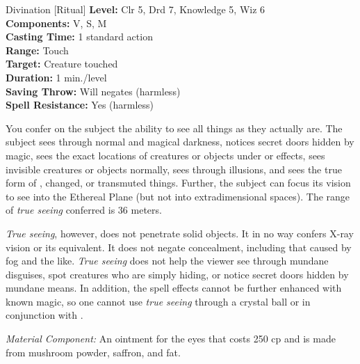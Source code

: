 {Divination [Ritual]}
{
	\textbf{Level:}
	Clr 5, Drd 7, Knowledge 5, Wiz 6\\
	\textbf{Components:}
	V, S, M\\
	\textbf{Casting Time:}
	1 standard action\\
	\textbf{Range:}
	Touch\\
	\textbf{Target:}
	Creature touched\\
	\textbf{Duration:}
	1 min./level\\
	\textbf{Saving Throw:}
	Will negates (harmless)\\
	\textbf{Spell Resistance:}
	Yes (harmless)\\
}
{
	You confer on the subject the ability to see all things as they actually are. The subject sees through normal and magical darkness, notices secret doors hidden by magic, sees the exact locations of creatures or objects under  or  effects, sees invisible creatures or objects normally, sees through illusions, and sees the true form of , changed, or transmuted things. Further, the subject can focus its vision to see into the Ethereal Plane (but not into extradimensional spaces). The range of \emph{true seeing} conferred is 36 meters.

	\emph{True seeing}, however, does not penetrate solid objects. It in no way confers X-ray vision or its equivalent. It does not negate concealment, including that caused by fog and the like. \emph{True seeing} does not help the viewer see through mundane disguises, spot creatures who are simply hiding, or notice secret doors hidden by mundane means. In addition, the spell effects cannot be further enhanced with known magic, so one cannot use \emph{true seeing} through a crystal ball or in conjunction with .

	\textit{Material Component:}
	An ointment for the eyes that costs 250 cp and is made from mushroom powder, saffron, and fat.

}
